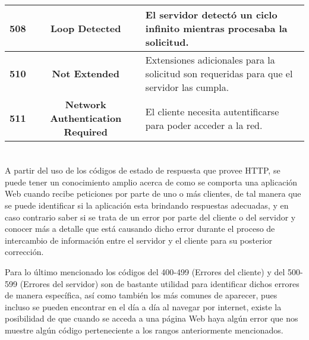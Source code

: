 \documentclass[10pt,a4paper]{article} %
\begin{document}
\begin{table}[H]
\begin{center}
\begin{tabular}{| c | c | p{8cm} |}
            \hline
            \textbf{508} & \textbf{Loop Detected} & El servidor detect{\'o} un ciclo infinito mientras procesaba la solicitud. \\
            \hline
            \textbf{510} & \textbf{Not Extended} & Extensiones adicionales para la solicitud son requeridas para que el servidor las cumpla. \\
            \hline
            \textbf{511} & \textbf{Network Authentication Required} & El cliente necesita autentificarse para poder acceder a la red. \\
            \hline
        \end{tabular}
    \end{center}
\end{table}

\pagebreak


\section{}
{\large A partir del uso de los c{\' o}digos de estado de respuesta que provee HTTP, se puede tener un conocimiento amplio acerca de como se comporta una aplicaci{\' o}n Web cuando recibe peticiones por parte de uno o m{\' a}s clientes, de tal manera que se puede identificar si la aplicaci{\' o}n esta brindando respuestas adecuadas, y en caso contrario saber  si se trata de un error por parte del cliente o del servidor y conocer m{\' a}s a detalle que est{\' a} causando dicho error durante el proceso de intercambio de informaci{\' o}n entre el servidor y el cliente para su posterior correcci{\' o}n.


\vspace{0.5cm}
Para lo {\' u}ltimo mencionado los c{\' o}digos del 400-499 (Errores del cliente) y del 500-599 (Errores del servidor) son de bastante utilidad para identificar dichos errores de manera espec{\' i}fica, as{\' i} como tambi{\' e}n los m{\' a}s comunes de aparecer, pues incluso se pueden encontrar en el d{\' i}a a d{\' i}a al navegar por internet, existe la posibilidad de que cuando se acceda a una p{\' a}gina Web haya alg{\' u}n error que nos muestre alg{\' u}n c{\' o}digo perteneciente a los rangos anteriormente mencionados.}

\end{document}

